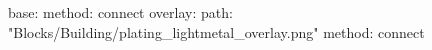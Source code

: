 base:
  method: connect
overlay:
  path: "Blocks/Building/plating_lightmetal_overlay.png"
  method: connect